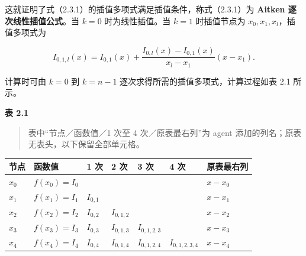 这就证明了式（2.3.1）的插值多项式满足插值条件，称式（2.3.1）为 \textbf{Aitken 逐次线性插值公式}。当 \(k=0\) 时为线性插值。当 \(k=1\) 时插值节点为 \(x_0,x_1,x_l\)，插值多项式为

\[
I_{0,1,l}(x)=I_{0,1}(x)
+\frac{I_{0,l}(x)-I_{0,1}(x)}{x_l-x_1}(x-x_1).
\]

计算时可由 \(k=0\) 到 \(k=n-1\) 逐次求得所需的插值多项式，计算过程如表 2.1 所示。

\textbf{表 2.1}

\begin{quote}
表中``节点／函数值／1 次至 4 次／原表最右列''为 agent 添加的列名；原表无表头，以下保留全部单元格。
\end{quote}

{\def\LTcaptype{none} %
\begin{longtable}[]{@{}
  >{\raggedright\arraybackslash}p{}
  >{\raggedright\arraybackslash}p{}
  >{\raggedright\arraybackslash}p{}
  >{\raggedright\arraybackslash}p{}
  >{\raggedright\arraybackslash}p{}
  >{\raggedright\arraybackslash}p{}
  >{\raggedright\arraybackslash}p{}@{}}
\toprule\noalign{}
\begin{minipage}[b]{\linewidth}\raggedright
节点
\end{minipage} & \begin{minipage}[b]{\linewidth}\raggedright
函数值
\end{minipage} & \begin{minipage}[b]{\linewidth}\raggedright
1 次
\end{minipage} & \begin{minipage}[b]{\linewidth}\raggedright
2 次
\end{minipage} & \begin{minipage}[b]{\linewidth}\raggedright
3 次
\end{minipage} & \begin{minipage}[b]{\linewidth}\raggedright
4 次
\end{minipage} & \begin{minipage}[b]{\linewidth}\raggedright
原表最右列
\end{minipage} \\
\midrule\noalign{}
\endhead
\bottomrule\noalign{}
\endlastfoot
\(x_0\) & \(f(x_0)=I_0\) & & & & & \(x-x_0\) \\
\(x_1\) & \(f(x_1)=I_1\) & \(I_{0,1}\) & & & & \(x-x_1\) \\
\(x_2\) & \(f(x_2)=I_2\) & \(I_{0,2}\) & \(I_{0,1,2}\) & & & \(x-x_2\) \\
\(x_3\) & \(f(x_3)=I_3\) & \(I_{0,3}\) & \(I_{0,1,3}\) & \(I_{0,1,2,3}\) & & \(x-x_3\) \\
\(x_4\) & \(f(x_4)=I_4\) & \(I_{0,4}\) & \(I_{0,1,4}\) & \(I_{0,1,2,4}\) & \(I_{0,1,2,3,4}\) & \(x-x_4\) \\
\end{longtable}
}

